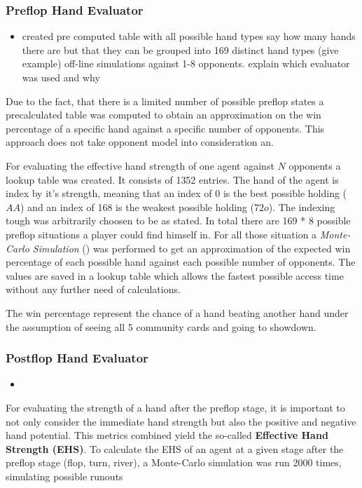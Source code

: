 \subsubsection{Preflop Hand Evaluator}
\begin{itemize}
\item created pre computed table with all possible hand types 
\subitem say how many hands there are but that they can be grouped into 169 distinct hand types (give example)
 off-line simulations against 1-8 opponents.
\subitem explain which evaluator was used and why
\end{itemize}
Due to the fact, that there is a limited number of possible preflop states a precalculated table was computed to obtain an approximation on the win percentage of a specific hand against a specific number of opponents. This approach does not take opponent model into consideration an. \par
For evaluating the effective hand strength of one agent against $N$ opponents a lookup table was created. It consists of 1352 entries. The hand of the agent is index by it's strength, meaning that an index of 0 is the best possible holding ($AA$) and an index of 168 is the weakest possible holding ($72o$). The indexing tough was arbitrarily choosen to be as stated. In total there are 169 * 8 possible preflop situations a player could find himself in. For all those situation a \textit{Monte-Carlo Simulation} () was performed to get an approximation of the expected win percentage of each possible hand against each possible number of opponents. The values are saved in a lookup table which allows the fastest possible access time without any further need of calculations. \par
The win percentage represent the chance of a hand beating another hand under the assumption of seeing all 5 community cards and going to showdown.
\subsubsection{Postflop Hand Evaluator}
\begin{itemize}
\item 
\end{itemize}
For evaluating the strength of a hand after the preflop stage, it is important to not only consider the immediate hand strength but also the positive and negative hand potential. This metrics combined yield the so-called \textbf{Effective Hand Strength (EHS)}. To calculate the EHS of an agent at a given stage after the preflop stage (flop, turn, river), a Monte-Carlo simulation was run 2000 times, simulating possible runouts
